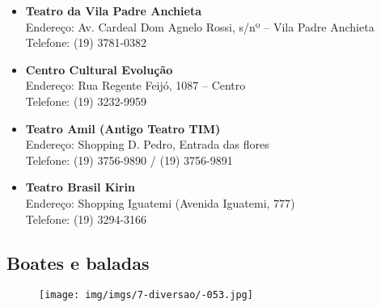 \begin{itemize}
\item   \textbf{Teatro da Vila Padre Anchieta}
		\\Endereço: Av. Cardeal Dom Agnelo Rossi, s/nº -- Vila Padre Anchieta
		\\Telefone: (19) 3781-0382

\item   \textbf{Centro Cultural Evolução}
		\\Endereço: Rua Regente Feijó, 1087 -- Centro
		\\Telefone: (19) 3232-9959

\item   \textbf{Teatro Amil (Antigo Teatro TIM)}
		\\Endereço: Shopping D. Pedro, Entrada das flores
		\\Telefone: (19) 3756-9890 / (19) 3756-9891

\item   \textbf{Teatro Brasil Kirin}
		\\Endereço: Shopping Iguatemi (Avenida Iguatemi, 777)
		\\Telefone: (19) 3294-3166

\end{itemize}

\subsection{Boates e baladas}

\begin{figure}[hb!]
    \centering
    \texttt{[image: img/imgs/7-diversao/-053.jpg]}
\end{figure}

